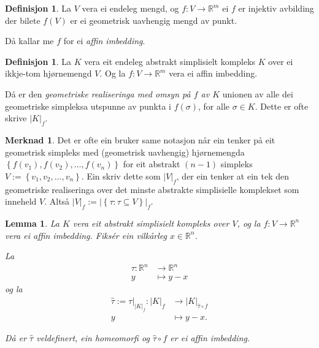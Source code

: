 \documentclass[a4paper, 12pt, norsk]{article}
\theoremstyle{plain}
\newtheorem{lemma}[theorem]{Lemma}
\theoremstyle{definition}
\newtheorem{definition}[theorem]{Definisjon}
\newtheorem{remark}[theorem]{Merknad}
\newcommand{\Rb}{\mathbb{R}}
\newcommand{\gr}[1]{ \lvert #1 \rvert } %
\newcommand{\set}[1]{ \left\{ #1 \right\} } %
\begin{document}
\begin{definition}
	La $V$ vera ei endeleg mengd, og $f:V\rightarrow \Rb^m$ ei $f$ er injektiv avbilding der bilete $f(V)$ er ei geometrisk uavhengig mengd av punkt. 
	
	Då kallar me \( f \) for ei \emph{affin imbedding}.
\end{definition}

\begin{definition} \label{def:gr}
	La \( K \) vera eit endeleg abstrakt simplisielt kompleks $K$ over ei ikkje-tom hjørnemengd $V$. Og la $f:V\to\Rb^m$ vera ei affin imbedding.
	
	Då er den \emph{geometriske realiseringa med omsyn på $f$ av \( K \)} unionen av alle dei geometriske simpleksa utspunne av punkta i $f(\sigma)$, for alle $\sigma\in K$. Dette er ofte skrive $\gr{K}_f$.
\end{definition}

\begin{remark} \label{rem:gr-SK}
	Det er ofte ein bruker same notasjon når ein tenker på eit geometrisk simpleks med (geometrisk uavhengig) hjørnemengda \( \set{f(v_1), f(v_2), \dots, f(v_n)} \) for eit abstrakt \( (n-1) \) simpleks \( V := \set{v_1, v_2, \dots, v_n} \). Ein skriv dette som \( \gr{V}_f \), der ein tenker at ein tek den geometriske realiseringa over det minste abstrakte simplisielle komplekset som inneheld \( V \). Altså \( \gr{V}_f := \gr{\set{\tau : \tau \subseteq V}}_f \).
\end{remark}

\begin{lemma} \label{thm:tau-homeomorfi}
	La \( K \) vera eit abstrakt simplisielt kompleks over \( V \), og la \( f: V \to \Rb^n \) vera ei affin imbedding. Fiksér ein vilkårleg \( x \in \Rb^n \).
	
	La
	\begin{align*}
		\tau: \Rb^n &\to \Rb^n \\
		y &\mapsto y - x
	\end{align*}
	og la
	\begin{align*}
		\hat{\tau} := \tau|_{\gr{K}_f}: \gr{K}_f &\to \gr{K}_{\hat{\tau} \circ f} \\
		y  &\mapsto y - x.
	\end{align*}

	Då er \( \hat{\tau} \) veldefinert, ein homeomorfi og \( \hat{\tau} \circ f \) er ei affin imbedding.
\end{lemma}
\end{document}
